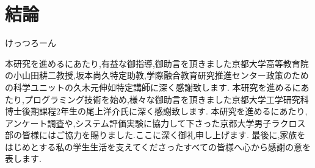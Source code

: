 \documentclass[sotsuron]{kuee}
\begin{document}
\chapter{結論}
けっつろーん


\begin{acknowledgements}
	本研究を進めるにあたり,有益な御指導,御助言を頂きました京都大学高等教育院の小山田耕二教授,坂本尚久特定助教,学際融合教育研究推進センター政策のための科学ユニットの久木元伸如特定講師に深く感謝致します.
	本研究を進めるにあたり,プログラミング技術を始め,様々な御助言を頂きました京都大学工学研究科博士後期課程2年生の尾上洋介氏に深く感謝致します.
	本研究を進めるにあたり,アンケート調査や,システム評価実験に協力して下さった京都大学男子ラクロス部の皆様にはご協力を賜りました.ここに深く御礼申し上げます.
	最後に,家族をはじめとする私の学生生活を支えてくださったすべての皆様へ心から感謝の意を表します.
\end{acknowledgements}








\appendix
\end{document}
